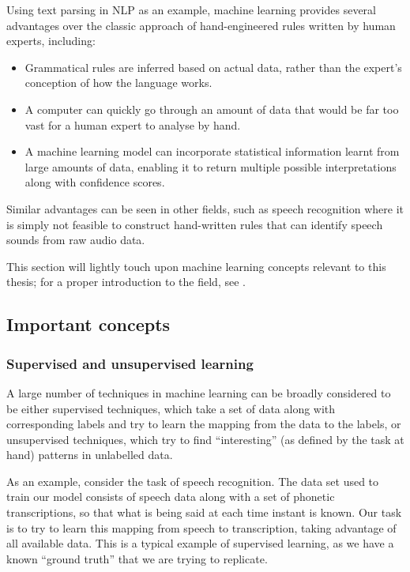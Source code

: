 Using text parsing in NLP as an example, machine learning provides several advantages over the classic approach of hand-engineered rules written by human experts, including:
\begin{itemize}
 \item Grammatical rules are inferred based on actual data, rather than the expert's conception of how the language works.
 \item A computer can quickly go through an amount of data that would be far too vast for a human expert to analyse by hand.
 \item A machine learning model can incorporate statistical information learnt from large amounts of data, enabling it to return multiple possible interpretations along with confidence scores.
\end{itemize}
Similar advantages can be seen in other fields, such as speech recognition where it is simply not feasible to construct hand-written rules that can identify speech sounds from raw audio data.

This section will lightly touch upon machine learning concepts relevant to this thesis; for a proper introduction to the field, see \textcite{murphy2012machine}.

\subsection{Important concepts}
\subsubsection{Supervised and unsupervised learning}

A large number of techniques in machine learning can be broadly considered to be either supervised techniques, which take a set of data along with corresponding labels and try to learn the mapping from the data to the labels, or unsupervised techniques, which try to find ``interesting'' (as defined by the task at hand) patterns in unlabelled data.

As an example, consider the task of speech recognition.
The data set used to train our model consists of speech data along with a set of phonetic transcriptions, so that what is being said at each time instant is known.
Our task is to try to learn this mapping from speech to transcription, taking advantage of all available data.
This is a typical example of supervised learning, as we have a known ``ground truth'' that we are trying to replicate.

